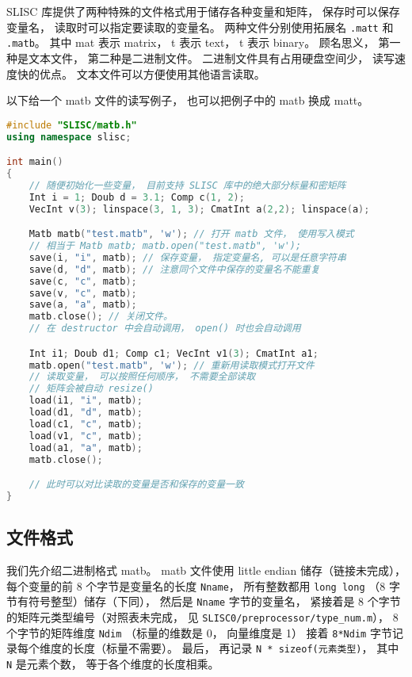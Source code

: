 
\begin{issues}
\issueTODO
\end{issues}


SLISC 库提供了两种特殊的文件格式用于储存各种变量和矩阵， 保存时可以保存变量名， 读取时可以指定要读取的变量名。 两种文件分别使用拓展名 \verb|.matt| 和 \verb|.matb|。 其中 mat 表示 matrix， t 表示 text， t 表示 binary。 顾名思义， 第一种是文本文件， 第二种是二进制文件。 二进制文件具有占用硬盘空间少， 读写速度快的优点。 文本文件可以方便使用其他语言读取。

以下给一个 matb 文件的读写例子， 也可以把例子中的 matb 换成 matt。

\begin{lstlisting}[language=cpp]
#include "SLISC/matb.h"
using namespace slisc;

int main()
{
    // 随便初始化一些变量， 目前支持 SLISC 库中的绝大部分标量和密矩阵
    Int i = 1; Doub d = 3.1; Comp c(1, 2);
    VecInt v(3); linspace(3, 1, 3); CmatInt a(2,2); linspace(a);

    Matb matb("test.matb", 'w'); // 打开 matb 文件， 使用写入模式
    // 相当于 Matb matb; matb.open("test.matb", 'w');
    save(i, "i", matb); // 保存变量， 指定变量名, 可以是任意字符串
    save(d, "d", matb); // 注意同个文件中保存的变量名不能重复
    save(c, "c", matb);
    save(v, "c", matb);
    save(a, "a", matb);
    matb.close(); // 关闭文件。
    // 在 destructor 中会自动调用， open() 时也会自动调用

    Int i1; Doub d1; Comp c1; VecInt v1(3); CmatInt a1;
    matb.open("test.matb", 'w'); // 重新用读取模式打开文件
    // 读取变量， 可以按照任何顺序， 不需要全部读取
    // 矩阵会被自动 resize()
    load(i1, "i", matb); 
    load(d1, "d", matb);
    load(c1, "c", matb);
    load(v1, "c", matb);
    load(a1, "a", matb);
    matb.close();

    // 此时可以对比读取的变量是否和保存的变量一致
}
\end{lstlisting}

\subsection{文件格式}
我们先介绍二进制格式 matb。 matb 文件使用 little endian 储存（链接未完成）， 每个变量的前 8 个字节是变量名的长度 \verb|Nname|， 所有整数都用 \verb|long long| （8 字节有符号整型）储存（下同）， 然后是 \verb|Nname| 字节的变量名， 紧接着是 8 个字节的矩阵元类型编号（对照表未完成， 见 \verb|SLISC0/preprocessor/type_num.m|）， 8 个字节的矩阵维度 \verb|Ndim| （标量的维数是 0， 向量维度是 1） 接着 \verb|8*Ndim| 字节记录每个维度的长度（标量不需要）。 最后， 再记录 \verb|N * sizeof(元素类型)|， 其中 \verb|N| 是元素个数， 等于各个维度的长度相乘。

